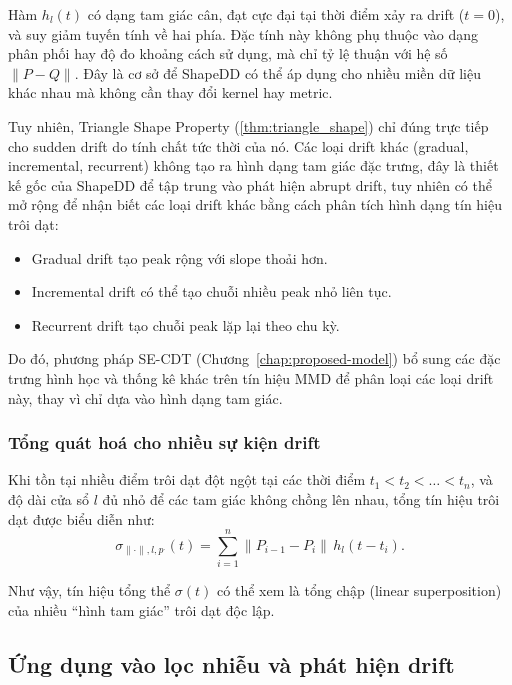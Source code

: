 Hàm $h_l(t)$ có dạng tam giác cân, đạt cực đại tại thời điểm xảy ra drift ($t=0$), và suy giảm tuyến tính về hai phía. Đặc tính này không phụ thuộc vào dạng phân phối hay độ đo khoảng cách sử dụng, mà chỉ tỷ lệ thuận với hệ số $\|P - Q\|$. Đây là cơ sở để ShapeDD có thể áp dụng cho nhiều miền dữ liệu khác nhau mà không cần thay đổi kernel hay metric.

Tuy nhiên, Triangle Shape Property (\ref{thm:triangle_shape}) chỉ đúng trực tiếp cho sudden drift do tính chất tức thời của nó. Các loại drift khác (gradual, incremental, recurrent) không tạo ra hình dạng tam giác đặc trưng, đây là thiết kế gốc của ShapeDD để tập trung vào phát hiện abrupt drift, tuy nhiên có thể mở rộng để nhận biết các loại drift khác bằng cách phân tích hình dạng tín hiệu trôi dạt:
\begin{itemize}
	\item Gradual drift tạo peak rộng với slope thoải hơn.
	\item Incremental drift có thể tạo chuỗi nhiều peak nhỏ liên tục.
	\item Recurrent drift tạo chuỗi peak lặp lại theo chu kỳ.
\end{itemize}
Do đó, phương pháp SE-CDT (Chương~\ref{chap:proposed-model}) bổ sung các đặc trưng hình học và thống kê khác trên tín hiệu MMD để phân loại các loại drift này, thay vì chỉ dựa vào hình dạng tam giác.

\subsubsection{Tổng quát hoá cho nhiều sự kiện drift}

Khi tồn tại nhiều điểm trôi dạt đột ngột tại các thời điểm $t_1 < t_2 < \dots < t_n$, và độ dài cửa sổ $l$ đủ nhỏ để các tam giác không chồng lên nhau,
tổng tín hiệu trôi dạt được biểu diễn như:
\begin{equation}
	\sigma_{\parallel \cdot \parallel, l, p^\cdot}(t)
	= \sum_{i=1}^{n} \| P_{i-1} - P_i \| \, h_l(t - t_i).
\end{equation}

Như vậy, tín hiệu tổng thể $\sigma(t)$ có thể xem là tổng chập (linear superposition) của nhiều “hình tam giác” trôi dạt độc lập.

\subsection{Ứng dụng vào lọc nhiễu và phát hiện drift}

